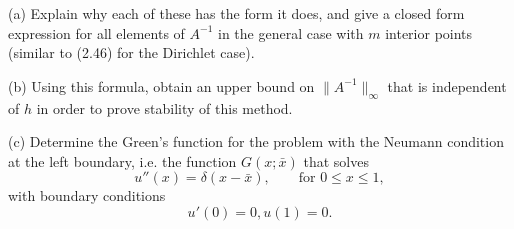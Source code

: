 \documentclass[10pt]{article}
\begin{document}
(a) Explain why each of these has the form it does, and give 
a closed form expression for all elements of $A^{-1}$ in the general case
with $m$ interior points (similar to (2.46) for the Dirichlet case).

(b) Using this formula, obtain an upper bound on $\|A^{-1}\|_\infty$
that is independent of $h$ in order to prove stability of this method.

(c) Determine the Green's function for the problem with the Neumann condition
at the left boundary, i.e. the function $G(x; \bar x)$ that solves
\[
u''(x) = \delta(x-\bar x), \qquad \text{for~} 0\leq x \leq 1,
\]
with boundary conditions
\[
u'(0) = 0, u(1) = 0.
\]





\end{document}
